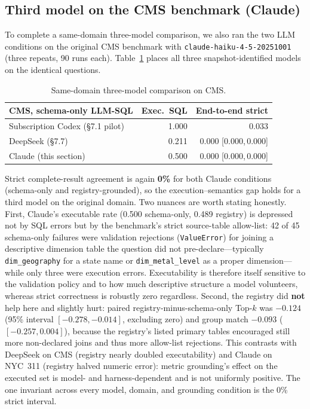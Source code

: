 \documentclass[11pt]{article}
\newcommand{\ci}[2]{[#1,\,#2]}
\begin{document}
\subsection{Third model on the CMS benchmark (Claude)}
To complete a same-domain three-model comparison, we also ran the two LLM
conditions on the original CMS benchmark with \texttt{claude-haiku-4-5-20251001}
(three repeats, 90 runs each). Table~\ref{tab:threemodel} places all three
snapshot-identified models on the identical questions.

\begin{table}[h]
\centering\small
\begin{tabular}{lrr}
\toprule
CMS, schema-only LLM-SQL & Exec.\ SQL & End-to-end strict \\
\midrule
Subscription Codex (\S7.1 pilot) & 1.000 & 0.033 \\
DeepSeek (\S7.7) & 0.211 & 0.000 \ci{0.000}{0.000} \\
Claude (this section) & 0.500 & 0.000 \ci{0.000}{0.000} \\
\bottomrule
\end{tabular}
\caption{Same-domain three-model comparison on CMS.}
\label{tab:threemodel}
\end{table}

Strict complete-result agreement is again \textbf{0\%} for both Claude conditions
(schema-only and registry-grounded), so the execution--semantics gap holds for a
third model on the original domain. Two nuances are worth stating honestly. First,
Claude's executable rate (0.500 schema-only, 0.489 registry) is depressed not by
SQL errors but by the benchmark's strict source-table allow-list: 42 of 45
schema-only failures were validation rejections (\texttt{ValueError}) for joining
a descriptive dimension table the question did not pre-declare---typically
\texttt{dim\_geography} for a state name or \texttt{dim\_metal\_level} as a proper
dimension---while only three were execution errors. Executability is therefore
itself sensitive to the validation policy and to how much descriptive structure a
model volunteers, whereas strict correctness is robustly zero regardless. Second,
the registry did \textbf{not} help here and slightly hurt: paired
registry-minus-schema-only Top-$k$ was $-0.124$ (95\% interval $[-0.278, -0.014]$,
excluding zero) and group match $-0.093$ ($[-0.257, 0.004]$), because the
registry's listed primary tables encouraged still more non-declared joins and thus
more allow-list rejections. This contrasts with DeepSeek on CMS (registry nearly
doubled executability) and Claude on NYC~311 (registry halved numeric error):
metric grounding's effect on the executed set is model- and harness-dependent and
is not uniformly positive. The one invariant across every model, domain, and
grounding condition is the 0\% strict interval.
\end{document}
